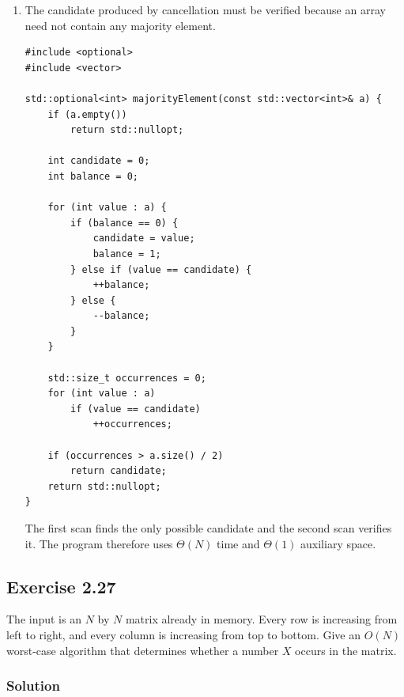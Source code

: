 \documentclass[12pt,a4paper]{article}
\begin{document}
\begin{enumerate}
  An even simpler constant-space implementation uses the equivalent
  Boyer--Moore cancellation process: keep one candidate and a balance,
  cancelling each occurrence of a different value against one
  occurrence of the candidate.

  \item The candidate produced by cancellation must be verified because
  an array need not contain any majority element.

\begin{lstlisting}
#include <optional>
#include <vector>

std::optional<int> majorityElement(const std::vector<int>& a) {
    if (a.empty())
        return std::nullopt;

    int candidate = 0;
    int balance = 0;

    for (int value : a) {
        if (balance == 0) {
            candidate = value;
            balance = 1;
        } else if (value == candidate) {
            ++balance;
        } else {
            --balance;
        }
    }

    std::size_t occurrences = 0;
    for (int value : a)
        if (value == candidate)
            ++occurrences;

    if (occurrences > a.size() / 2)
        return candidate;
    return std::nullopt;
}
\end{lstlisting}

  The first scan finds the only possible candidate and the second scan
  verifies it. The program therefore uses $\boxed{\Theta(N)}$ time and
  $\boxed{\Theta(1)}$ auxiliary space.
\end{enumerate}

\subsection*{\color{sectionnavy}Exercise 2.27}

\noindent
The input is an $N$ by $N$ matrix already in memory. Every row is
increasing from left to right, and every column is increasing from top
to bottom. Give an $O(N)$ worst-case algorithm that determines whether
a number $X$ occurs in the matrix.

\subsubsection*{\color{sectionnavy}Solution}
\end{document}
